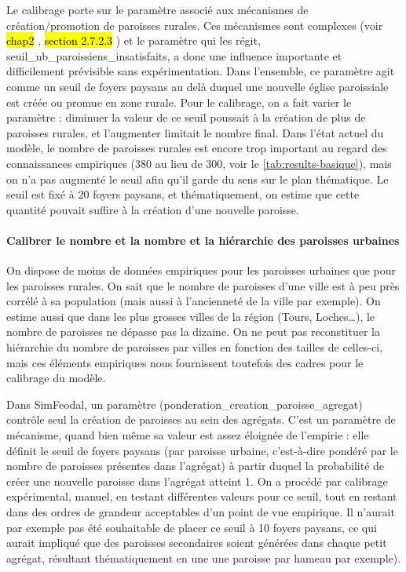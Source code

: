 Le calibrage porte sur le paramètre associé aux mécanismes de création/promotion de paroisses rurales.
Ces mécanismes sont complexes (voir \hl{chap2}%
, \hl{section 2.7.2.3}%
) et le paramètre qui les régit, \textsf{seuil\_nb\_paroissiens\_insatisfaits}, a donc une influence importante et difficilement prévisible sans expérimentation.
Dans l'ensemble, ce paramètre agit comme un seuil de foyers paysans au delà duquel une nouvelle église paroissiale est créée ou promue en zone rurale.
Pour le calibrage, on a fait varier le paramètre  : diminuer la valeur de ce seuil poussait à la création de plus de paroisses rurales, et l'augmenter limitait le nombre final.
Dans l'état actuel du modèle, le nombre de paroisses rurales est encore trop important au regard des connaissances empiriques (380 au lieu de 300, voir le \vref{tab:results-basique}), mais on n'a pas augmenté le seuil afin qu'il garde du sens sur le plan thématique.
Le seuil est fixé à 20 foyers paysans, et thématiquement, on estime que cette quantité pouvait suffire à la création d'une nouvelle paroisse.

\paragraph{Calibrer le nombre et la nombre et la hiérarchie des paroisses \og urbaines\fg{}}

On dispose de moins de données empiriques pour les paroisses urbaines que pour les paroisses rurales.
On sait que le nombre de paroisses d'une ville est à peu près corrélé à sa population (mais aussi à l'ancienneté de la ville par exemple).
On estime aussi que dans les plus grosses villes de la région (Tours, Loches\ldots), le nombre de paroisses ne dépasse pas la dizaine.
On ne peut pas reconstituer la hiérarchie du nombre de paroisses par villes en fonction des tailles de celles-ci, mais ces éléments empiriques nous fournissent toutefois des cadres pour le calibrage du modèle.

Dans SimFeodal, un paramètre (\textsf{ponderation\_creation\_paroisse\_agregat}) contrôle seul la création de paroisses au sein des agrégats.
C'est un \og paramètre de mécanisme\fg{}, quand bien même sa valeur est assez éloignée de l'empirie : elle définit le seuil de foyers paysans (par paroisse urbaine, c'est-à-dire pondéré par le nombre de paroisses présentes dans l'agrégat) à partir duquel la probabilité de créer une nouvelle paroisse dans l'agrégat atteint 1.
On a procédé par calibrage expérimental, manuel, en testant différentes valeurs pour ce seuil, tout en restant dans des ordres de grandeur acceptables d'un point de vue empirique.
Il n'aurait par exemple pas été souhaitable de placer ce seuil à 10 foyers paysans, ce qui aurait impliqué que des paroisses secondaires soient générées dans chaque petit agrégat, résultant thématiquement en une une paroisse par hameau par exemple).

